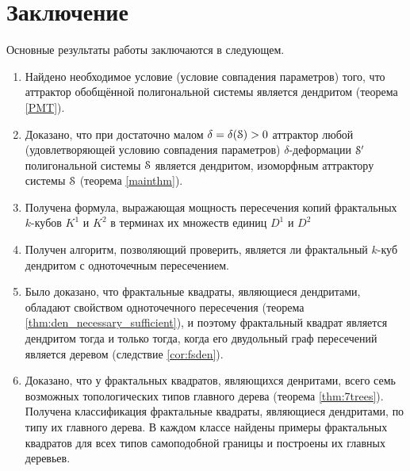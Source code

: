 \chapter*{Заключение}                       %


Основные результаты работы заключаются в следующем.

\begin{enumerate}
\item Найдено необходимое условие (условие совпадения параметров) того, что аттрактор обобщённой полигональной системы является дендритом (теорема \ref{PMT}). 

\item Доказано, что при достаточно малом $\delta=\delta({\EuScript S})>0$ аттрактор любой (удовлетворяющей условию совпадения параметров) $\delta$-деформации ${\EuScript S}'$  полигональной системы ${\EuScript S}$ является дендритом, изоморфным аттрактору системы ${\EuScript S}$ (теорема \ref{mainthm}).

\item Получена формула, выражающая мощность пересечения копий фрактальных $k$-кубов $K^1$ и $K^2$ в терминах их множеств единиц $D^1$ и $D^2$

\item Получен алгоритм, позволяющий проверить, является ли фрактальный $k$-куб дендритом с одноточечным пересечением.

\item Было доказано, что фрактальные квадраты, являющиеся дендритами, обладают свойством одноточечного пересечения (теорема \ref{thm:den_necessary_sufficient}), и поэтому фрактальный квадрат является дендритом тогда и только тогда, когда его двудольный граф пересечений является деревом (следствие \ref{cor:fsden}).

\item Доказано, что у фрактальных квадратов, являющихся денритами, всего семь возможных топологических типов главного дерева (теорема \ref{thm:7trees}).
Получена классификация фрактальные квадраты, являющиеся дендритами, по типу их главного дерева.
В каждом классе найдены примеры фрактальных квадратов для всех типов самоподобной границы и построены их главных деревьев.
\end{enumerate}

